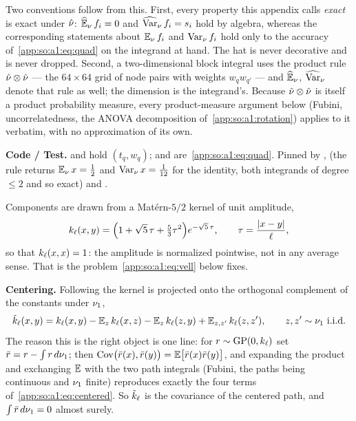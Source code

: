 Two conventions follow from this. First, every property this appendix calls
\emph{exact} is exact under $\hat\nu$: $\operatorname{\widehat{\mathbb{E}}}_\nu f_i=0$ and $\operatorname{\widehat{\mathrm{Var}}}_\nu f_i=s_i$ hold
by algebra, whereas the corresponding statements about $\operatorname{\mathbb{E}}_\nu f_i$ and $\operatorname{\mathrm{Var}}_\nu
f_i$ hold only to the accuracy of~\eqref{app:so:a1:eq:quad} on the integrand
at hand. The hat is never decorative and is never dropped. Second, a
two-dimensional block integral uses the product rule $\hat\nu\otimes\hat\nu$ ---
the $64\times64$ grid of node pairs with weights $w_q w_{q'}$ --- and $\operatorname{\widehat{\mathbb{E}}}_\nu$,
$\operatorname{\widehat{\mathrm{Var}}}_\nu$ denote that rule as well; the dimension is the integrand's. Because
$\hat\nu\otimes\hat\nu$ is itself a product probability measure, every
product-measure argument below (Fubini, uncorrelatedness, the ANOVA
decomposition of~\ref{app:so:a1:rotation}) applies to it verbatim, with no
approximation of its own.

\begin{sloppypar}
\textbf{Code / Test.}  and
 hold $(t_q,w_q)$;  and
 are~\eqref{app:so:a1:eq:quad}. Pinned by
,
 (the rule returns
$\operatorname{\mathbb{E}}_\nu x=\tfrac12$ and $\operatorname{\mathrm{Var}}_\nu x=\tfrac1{12}$ for the identity, both integrands
of degree $\le2$ and so exact) and
.
\end{sloppypar}

\label{app:so:a1:kernel}

Components are drawn from a Mat\'ern-$5/2$ kernel of unit amplitude,
\begin{equation}\label{app:so:a1:eq:matern}
  k_\ell(x,y)=\Bigl(1+\sqrt5\,\tau+\tfrac53\tau^2\Bigr)e^{-\sqrt5\,\tau},
  \qquad
  \tau=\frac{|x-y|}{\ell},
\end{equation}
so that $k_\ell(x,x)=1$: the amplitude is normalized pointwise, not in any
average sense. That is the problem~\eqref{app:so:a1:eq:vell} below fixes.

\textbf{Centering.} Following \SOciteOAK{} the kernel is projected onto the
orthogonal complement of the constants under $\nu_1$,
\begin{equation}\label{app:so:a1:eq:centered}
  \ktil(x,y)=\kl(x,y)-\Ex{z}\kl(x,z)-\Ex{z}\kl(z,y)+\Ex{z,z'}\kl(z,z'),
  \qquad z,z'\sim\refnu_1\ \text{i.i.d.}
\end{equation}
The reason this is the right object is one line: for $r\sim\mathrm{GP}(0,k_\ell)$
set $\bar r=r-\int r\,d\nu_1$; then
$\operatorname{Cov}\bigl(\bar r(x),\bar r(y)\bigr)
=\Ex{}\bigl[\bar r(x)\bar r(y)\bigr]$, and expanding the product
and exchanging $\Ex{}$ with the two path integrals (Fubini, the paths being
continuous and $\nu_1$ finite) reproduces exactly the four terms
of~\eqref{app:so:a1:eq:centered}. So $\tilde k_\ell$ is the covariance of the centered
path, and $\int\bar r\,d\nu_1=0$ almost surely.

